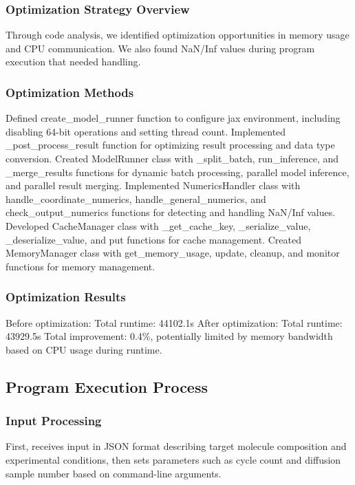 \documentclass[a4paper,12pt]{article}
\begin{document}
\subsubsection{Optimization Strategy Overview}
Through code analysis, we identified optimization opportunities in memory usage and CPU communication. We also found NaN/Inf values during program execution that needed handling.

\subsubsection{Optimization Methods}
Defined create\_model\_runner function to configure jax environment, including disabling 64-bit operations and setting thread count. Implemented \_post\_process\_result function for optimizing result processing and data type conversion. Created ModelRunner class with \_split\_batch, run\_inference, and \_merge\_results functions for dynamic batch processing, parallel model inference, and parallel result merging. Implemented NumericsHandler class with handle\_coordinate\_numerics, handle\_general\_numerics, and check\_output\_numerics functions for detecting and handling NaN/Inf values. Developed CacheManager class with \_get\_cache\_key, \_serialize\_value, \_deserialize\_value, and put functions for cache management. Created MemoryManager class with get\_memory\_usage, update, cleanup, and monitor functions for memory management.

\subsubsection{Optimization Results}
Before optimization: Total runtime: 44102.1s
After optimization: Total runtime: 43929.5s
Total improvement: 0.4\%, potentially limited by memory bandwidth based on CPU usage during runtime.

\subsection{Program Execution Process}

\subsubsection{Input Processing}
First, receives input in JSON format describing target molecule composition and experimental conditions, then sets parameters such as cycle count and diffusion sample number based on command-line arguments.
\end{document}
